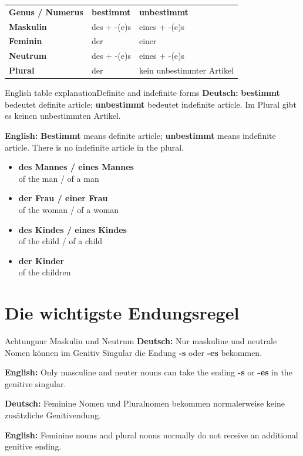 \documentclass[a4paper,11pt]{article}
\newcommand{\GermanText}[1]{\textbf{Deutsch: }#1\par}
\newcommand{\EnglishText}[1]{{\small\color{SoftGray}\textbf{English: }#1\par}}
\newcommand{\ExampleItem}[2]{\item \textbf{#1}\\{\small\color{SoftGray}#2}}
\begin{document}
        \begin{longtable}{>{\bfseries}p{3.2cm}|>{\centering\arraybackslash}p{5.1cm}|>{\centering\arraybackslash}p{5.1cm}}
            \rowcolor{HeaderBlueDark}
            \color{white}\textbf{Genus / Numerus} &
            \color{white}\textbf{bestimmt} &
            \color{white}\textbf{unbestimmt} \\
            Maskulin & des + -(e)s & eines + -(e)s \\
            Feminin & der & einer \\
            Neutrum & des + -(e)s & eines + -(e)s \\
            Plural & der & kein unbestimmter Artikel \\
        \end{longtable}

        \begin{grammarentry}{English table explanation}{Definite and indefinite forms}
            \GermanText{\textbf{bestimmt} bedeutet definite article; \textbf{unbestimmt} bedeutet indefinite article. Im Plural gibt es keinen unbestimmten Artikel.}
            \EnglishText{\textbf{Bestimmt} means definite article; \textbf{unbestimmt} means indefinite article. There is no indefinite article in the plural.}
        \end{grammarentry}

        \begin{exbox}
            \begin{itemize}
                \ExampleItem{des Mannes / eines Mannes}{of the man / of a man}
                \ExampleItem{der Frau / einer Frau}{of the woman / of a woman}
                \ExampleItem{des Kindes / eines Kindes}{of the child / of a child}
                \ExampleItem{der Kinder}{of the children}
            \end{itemize}
        \end{exbox}

    \section{Die wichtigste Endungsregel}

        \begin{grammarentry}{Achtung}{nur Maskulin und Neutrum}
            \GermanText{Nur maskuline und neutrale Nomen können im Genitiv Singular die Endung \textbf{-s} oder \textbf{-es} bekommen.}
            \EnglishText{Only masculine and neuter nouns can take the ending \textbf{-s} or \textbf{-es} in the genitive singular.}

            \GermanText{Feminine Nomen und Pluralnomen bekommen normalerweise keine zusätzliche Genitivendung.}
            \EnglishText{Feminine nouns and plural nouns normally do not receive an additional genitive ending.}
        \end{grammarentry}
\end{document}
